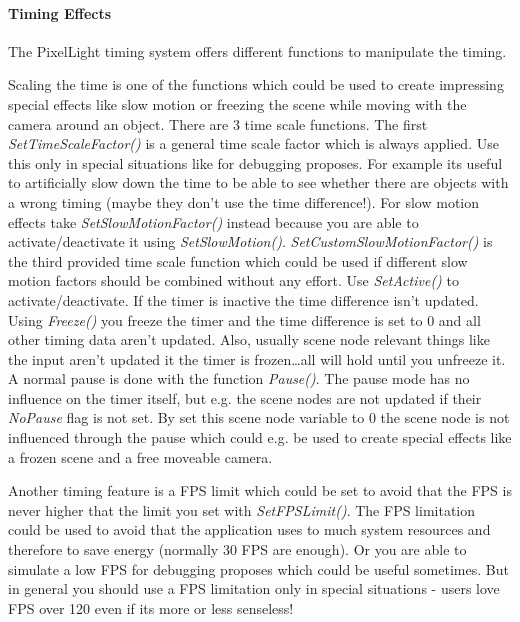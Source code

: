 \paragraph{Timing Effects}
The PixelLight timing system offers different functions to manipulate the timing.

Scaling the time is one of the functions which could be used to create impressing special effects like slow motion or freezing the scene while moving with the camera around an object. There are 3 time scale functions. The first \emph{SetTimeScaleFactor()} is a general time scale factor which is always applied. Use this only in special situations like for debugging proposes. For example its useful to artificially slow down the time to be able to see whether there are objects with a wrong timing (maybe they don't use the time difference!). For slow motion effects take \emph{SetSlowMotionFactor()} instead because you are able to activate/deactivate it using \emph{SetSlowMotion()}. \emph{SetCustomSlowMotionFactor()} is the third provided time scale function which could be used if different slow motion factors should be combined without any effort. Use \emph{SetActive()} to activate/deactivate. If the timer is inactive the time difference isn't updated. Using \emph{Freeze()} you freeze the timer and the time difference is set to 0 and all other timing data aren't updated. Also, usually scene node relevant things like the input aren't updated it the timer is frozen\ldots all will hold until you unfreeze it. A normal pause is done with the function \emph{Pause()}. The pause mode has no influence on the timer itself, but e.g. the scene nodes are not updated if their \emph{NoPause} flag is not set. By set this scene node variable to 0 the scene node is not influenced through the pause which could e.g. be used to create special effects like a frozen scene and a free moveable camera.

Another timing feature is a \ac{FPS} limit which could be set to avoid that the \ac{FPS} is never higher that the limit you set with \emph{SetFPSLimit()}. The \ac{FPS} limitation could be used to avoid that the application uses to much system resources and therefore to save energy (normally 30 \ac{FPS} are enough). Or you are able to simulate a low \ac{FPS} for debugging proposes which could be useful sometimes. But in general you should use a \ac{FPS} limitation only in special situations - users love \ac{FPS} over 120 even if its more or less senseless!





